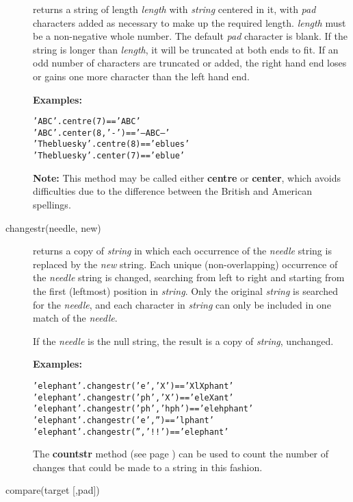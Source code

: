 \begin{description}
returns a string of length \emph{length} with \emph{string}
centered in it, with \emph{pad} characters added as necessary to
make up the required length.
\emph{length} must be a non-negative whole number.
The default \emph{pad} character is blank.
If the string is longer than \emph{length}, it will be truncated at
both ends to fit.
If an odd number of characters are truncated or added, the right hand
end loses or gains one more character than the left hand end.
 
\textbf{Examples:}
\begin{alltt}
'ABC'.centre(7)          == '  ABC  '
'ABC'.center(8,'-')      == '--ABC---'
'The blue sky'.centre(8) == 'e blue s'
'The blue sky'.center(7) == 'e blue '
\end{alltt}
\textbf{Note: }This method may be called either \textbf{centre} or \textbf{center},
which avoids difficulties due to the difference between the British and
American spellings.
\item[changestr(needle, new)]\label{refchastr}

returns a copy of \emph{string} in which each occurrence of the
\emph{needle} string is replaced by the \emph{new} string.
Each unique (non-overlapping) occurrence of the \emph{needle} string
is changed, searching from left to right and starting from the first
(leftmost) position in \emph{string}.
Only the original \emph{string} is searched for the
\emph{needle}, and each character in \emph{string} can only be
included in one match of the \emph{needle}.
 
If the \emph{needle} is the null string, the result is a copy of
\emph{string}, unchanged.
 
\textbf{Examples:}
\begin{alltt}
'elephant'.changestr('e','X')    == 'XlXphant'
'elephant'.changestr('ph','X')   == 'eleXant'
'elephant'.changestr('ph','hph') == 'elehphant'
'elephant'.changestr('e','')     == 'lphant'
'elephant'.changestr('','!!')    == 'elephant'
\end{alltt}
 The  \textbf{countstr} method (see page \pageref{refcoustr})  can be used to
count the number of changes that could be made to a string in this
fashion.
\item[compare(target [,pad{]})]\label{refcompar}


\end{description}
